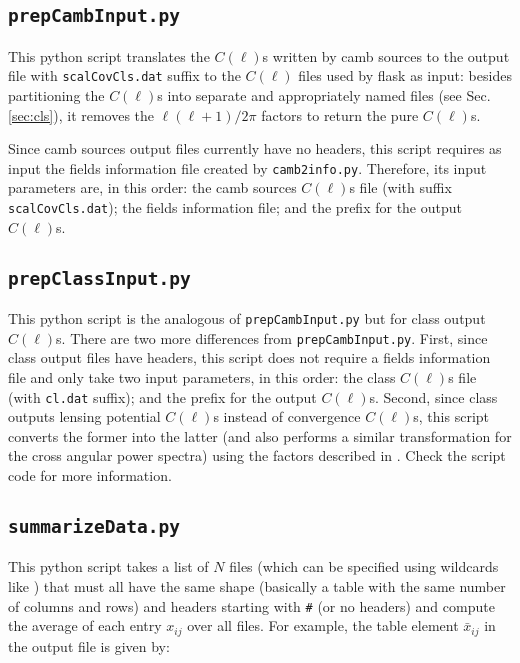 \documentclass[12pt]{book} %
\begin{document}
\subsection{{\tt prepCambInput.py}}
\label{sec:prepcambinput}

This {\sc python} script translates the $C(\ell)$s written by {\sc camb sources} to the 
output file with {\tt scalCovCls.dat} suffix to the $C(\ell)$ files used by {\sc flask} 
as input: besides partitioning the $C(\ell)$s into separate and appropriately named files  
(see Sec. \ref{sec:cls}), it removes the $\ell(\ell+1)/2\pi$ factors to return the pure 
$C(\ell)$s. 

Since {\sc camb sources} output files currently have no headers, this script requires 
as input the fields information file created by {\tt camb2info.py}. Therefore, its input 
parameters are, in this order: the {\sc camb sources} $C(\ell)$s file (with suffix {\tt scalCovCls.dat}); 
the fields information file; and the prefix for the output $C(\ell)$s.

\subsection{{\tt prepClassInput.py}}
\label{sec:prepclassinput}

This {\sc python} script is the analogous of {\tt prepCambInput.py} but for {\sc class} 
output $C(\ell)$s. There are two more differences from {\tt prepCambInput.py}. First, since 
{\sc class} output files have headers, this script does not require a fields information 
file and only take two input parameters, in  this order: the {\sc class} $C(\ell)$s file 
(with {\tt cl.dat} suffix); and the prefix for the output $C(\ell)$s. Second, since 
{\sc class} outputs lensing potential $C(\ell)$s instead of convergence $C(\ell)$s, this script 
converts the former into the latter (and also performs a similar transformation for the cross angular power spectra) using the 
factors described in \citet{Hu00x}. Check the script code for more information. 

\subsection{{\tt summarizeData.py}}
\label{sec:summarizedata}

This {\sc python} script takes a list of $N$ files (which can be specified using wildcards like {\tt *}) 
that must all have the same shape (basically a table with the same number of columns and rows) 
and headers starting with {\tt \#} (or no headers) and compute the average of each entry $x_{ij}$ over all files. 
For example, the table element $\bar{x}_{ij}$ in the output file is given by:
\end{document}
